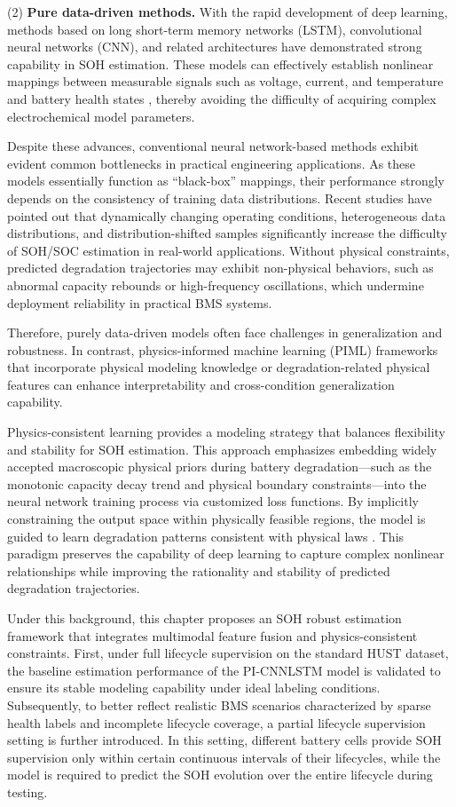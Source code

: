 \documentclass[a4paper,fleqn]{cas-dc}
\begin{document}
(2) \textbf{Pure data-driven methods.}  
With the rapid development of deep learning, methods based on long short-term memory networks (LSTM), convolutional neural networks (CNN), and related architectures have demonstrated strong capability in SOH estimation. These models can effectively establish nonlinear mappings between measurable signals such as voltage, current, and temperature and battery health states \citep{Lin2025}, thereby avoiding the difficulty of acquiring complex electrochemical model parameters.

Despite these advances, conventional neural network-based methods exhibit evident common bottlenecks in practical engineering applications. As these models essentially function as “black-box” mappings, their performance strongly depends on the consistency of training data distributions. Recent studies \citep{Tao2024,Lin2025} have pointed out that dynamically changing operating conditions, heterogeneous data distributions, and distribution-shifted samples significantly increase the difficulty of SOH/SOC estimation in real-world applications. Without physical constraints, predicted degradation trajectories may exhibit non-physical behaviors, such as abnormal capacity rebounds or high-frequency oscillations, which undermine deployment reliability in practical BMS systems. 

Therefore, purely data-driven models often face challenges in generalization and robustness. In contrast, physics-informed machine learning (PIML) frameworks that incorporate physical modeling knowledge or degradation-related physical features can enhance interpretability and cross-condition generalization capability.

Physics-consistent learning provides a modeling strategy that balances flexibility and stability for SOH estimation. This approach emphasizes embedding widely accepted macroscopic physical priors during battery degradation—such as the monotonic capacity decay trend and physical boundary constraints—into the neural network training process via customized loss functions. By implicitly constraining the output space within physically feasible regions, the model is guided to learn degradation patterns consistent with physical laws \citep{Lin2025,Sun2025}. This paradigm preserves the capability of deep learning to capture complex nonlinear relationships while improving the rationality and stability of predicted degradation trajectories.

Under this background, this chapter proposes an SOH robust estimation framework that integrates multimodal feature fusion and physics-consistent constraints. First, under full lifecycle supervision on the standard HUST dataset, the baseline estimation performance of the PI-CNNLSTM model is validated to ensure its stable modeling capability under ideal labeling conditions. Subsequently, to better reflect realistic BMS scenarios characterized by sparse health labels and incomplete lifecycle coverage, a partial lifecycle supervision setting is further introduced. In this setting, different battery cells provide SOH supervision only within certain continuous intervals of their lifecycles, while the model is required to predict the SOH evolution over the entire lifecycle during testing.
\end{document}
